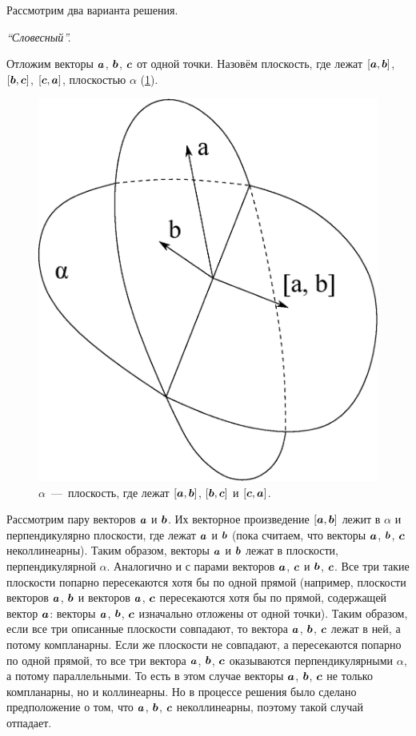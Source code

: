 \documentclass[a4paper,12pt]{article}
\begin{document}
  \begin{solution}
    Рассмотрим два варианта решения.
    
    \bigskip
    
    \emph{``Словесный''.}
    
    Отложим векторы $\boldsymbol a$, $\boldsymbol b$, $\boldsymbol c$ от одной точки.
    Назовём плоскость, где лежат $[\boldsymbol a, \boldsymbol b]$, $[\boldsymbol b, \boldsymbol c]$, $[\boldsymbol c, \boldsymbol a]$, плоскостью $\alpha$ (\ref{fig:awkward-atom-or-a-pair-of-eggs}).
        
    \begin{figure}[h]
      \centering
      
      \includegraphics[width=0.5\columnwidth]{awkward-atom-or-a-pair-of-eggs}
      
      \caption{$\alpha$~---~плоскость, где лежат $[\boldsymbol a, \boldsymbol b]$, $[\boldsymbol b, \boldsymbol c]$ и $[\boldsymbol c, \boldsymbol a]$.}
      \label{fig:awkward-atom-or-a-pair-of-eggs}
    \end{figure}
    
    Рассмотрим пару векторов $\boldsymbol a$ и $\boldsymbol b$.
    Их векторное произведение $[\boldsymbol a, \boldsymbol b]$ лежит в $\alpha$ и перпендикулярно плоскости, где лежат $\boldsymbol a$ и $\boldsymbol b$ (пока считаем, что векторы $\boldsymbol a$, $\boldsymbol b$, $\boldsymbol c$ неколлинеарны).
    Таким образом, векторы $\boldsymbol a$ и $\boldsymbol b$ лежат в плоскости, перпендикулярной $\alpha$.
    Аналогично и с парами векторов $\boldsymbol a$, $\boldsymbol c$ и $\boldsymbol b$, $\boldsymbol c$.
    Все три такие плоскости попарно пересекаются хотя бы по одной прямой (например, плоскости векторов $\boldsymbol a$, $\boldsymbol b$ и векторов $\boldsymbol a$, $\boldsymbol c$ пересекаются хотя бы по прямой, содержащей вектор $\boldsymbol a$: векторы $\boldsymbol a$, $\boldsymbol b$, $\boldsymbol c$ изначально отложены от одной точки).
    Таким образом, если все три описанные плоскости совпадают, то вектора $\boldsymbol a$, $\boldsymbol b$, $\boldsymbol c$ лежат в ней, а потому компланарны.
    Если же плоскости не совпадают, а пересекаются попарно по одной прямой, то все три вектора $\boldsymbol a$, $\boldsymbol b$, $\boldsymbol c$ оказываются перпендикулярными $\alpha$, а потому параллельными.
    То есть в этом случае векторы $\boldsymbol a$, $\boldsymbol b$, $\boldsymbol c$ не только компланарны, но и коллинеарны.
    Но в процессе решения было сделано предположение о том, что $\boldsymbol a$, $\boldsymbol b$, $\boldsymbol c$ неколлинеарны, поэтому такой случай отпадает.
    

\end{solution}
\end{document}
